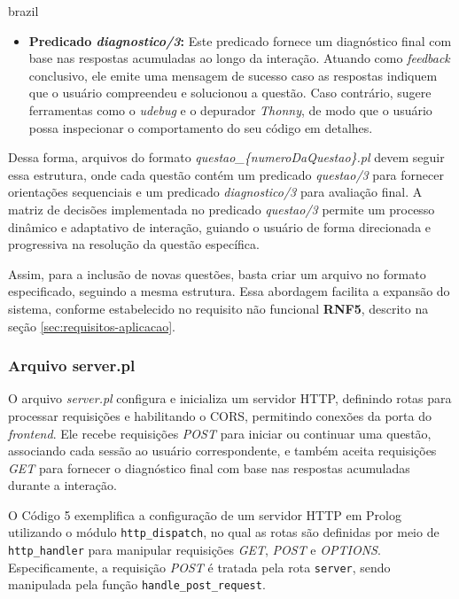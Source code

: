 \begin{otherlanguage*}{brazil}
\begin{itemize}
    \item \textbf{Predicado \textit{diagnostico/3}:} Este predicado fornece um diagnóstico final com base nas respostas acumuladas ao longo da interação. Atuando como \textit{feedback} conclusivo, ele emite uma mensagem de sucesso caso as respostas indiquem que o usuário compreendeu e solucionou a questão. Caso contrário, sugere ferramentas como o \textit{udebug} e o depurador \textit{Thonny}, de modo que o usuário possa inspecionar o comportamento do seu código em detalhes.
\end{itemize}

Dessa forma, arquivos do formato \textit{questao\_\{numeroDaQuestao\}.pl} devem seguir essa estrutura, onde cada questão contém um predicado \textit{questao/3} para fornecer orientações sequenciais e um predicado \textit{diagnostico/3} para avaliação final. A matriz de decisões implementada no predicado \textit{questao/3} permite um processo dinâmico e adaptativo de interação, guiando o usuário de forma direcionada e progressiva na resolução da questão específica.

Assim, para a inclusão de novas questões, basta criar um arquivo no formato especificado, seguindo a mesma estrutura.  Essa abordagem facilita a expansão do sistema, conforme estabelecido no requisito não funcional \textbf{RNF5}, descrito na seção \ref{sec:requisitos-aplicacao}.

\subsubsection{Arquivo server.pl}


O arquivo \textit{server.pl} configura e inicializa um servidor HTTP, definindo rotas para processar requisições e habilitando o CORS, permitindo conexões da porta do \textit{frontend}. Ele recebe requisições \textit{POST} para iniciar ou continuar uma questão, associando cada sessão ao usuário correspondente, e também aceita requisições \textit{GET} para fornecer o diagnóstico final com base nas respostas acumuladas durante a interação.

O Código 5 exemplifica a configuração de um servidor HTTP em Prolog utilizando o módulo \texttt{http\_dispatch}, no qual as rotas são definidas por meio de \texttt{http\_handler} para manipular requisições \textit{GET}, \textit{POST} e \textit{OPTIONS}. Especificamente, a requisição \textit{POST} é tratada pela rota \texttt{server}, sendo manipulada pela função \texttt{handle\_post\_request}.


\end{otherlanguage*}
